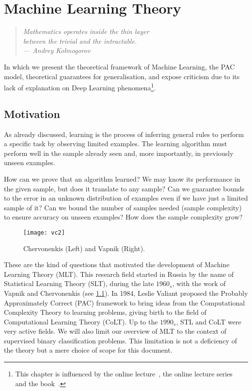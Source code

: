 

\chapter{Machine Learning Theory}\label{ch:mlt}

\begin{quotation}
	\small \textit{ \flushright Mathematics operates inside the thin layer \\
	between the trivial and the intractable.\\
	\flushright --- Andrey Kolmogorov\\
	\vspace{1cm} }
\end{quotation}

In which we present the theoretical framework of Machine Learning, the PAC model, theoretical guarantees for generalisation, and expose criticism due to its lack of explanation on Deep Learning phenomena\footnote{This chapter is influenced by the online lecture~\citeauthor{shawe-taylor:2018}, the online lecture series~\citeauthor{mello:2018online} and the book~\citeauthor{mello:2018}. }.


\section{Motivation} As already discussed, learning is the process of inferring general rules to perform a specific task by observing limited examples. The learning algorithm must perform well in the sample already seen and, more importantly, in previously unseen examples.

How can we prove that an algorithm learned? We may know its performance in the given sample, but does it translate to any sample? Can we guarantee bounds to the error in an unknown distribution of examples even if we have just a limited sample of it? Can we bound the number of samples needed (sample complexity) to ensure accuracy on unseen examples? How does the sample complexity grow?
\begin{figure}[hbt!]
	\centering
	\texttt{[image: vc2]}
	\caption{Chervonenkis (Left) and Vapnik (Right).}\label{fig:VC}
\end{figure}
These are the kind of questions that motivated the development of Machine Learning Theory (MLT). This research field started in Russia by the name of Statistical Learning Theory (SLT), during the late \(1960_s\), with the work of Vapnik and Chervonenkis (see \cref{fig:VC}). In 1984, Leslie Valiant proposed the Probably Approximately Correct (PAC) framework to bring ideas from the Computational Complexity Theory to learning problems, giving birth to the field of Computational Learning Theory (CoLT). Up to the \(1990_s\), STL and CoLT were very active fields.
We will also limit our overview of MLT to the context of supervised binary classification problems. This limitation is not a deficiency of the theory but a mere choice of scope for this document.


